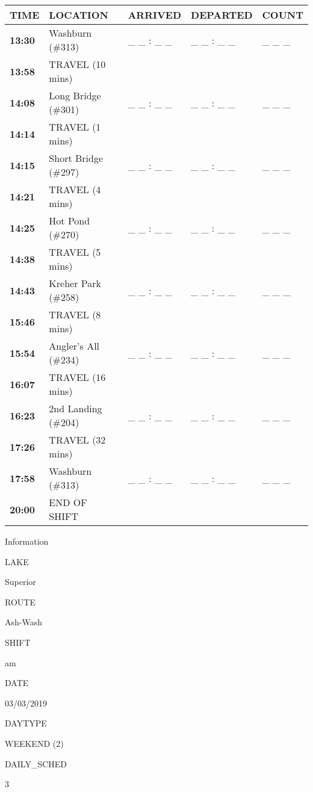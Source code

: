 \documentclass[]{article}
\begin{document}
\begin{tabular}{>{\bfseries}lllll}
\toprule
\textbf{TIME} & \textbf{LOCATION} & \textbf{ARRIVED} & \textbf{DEPARTED} & \textbf{COUNT}\\
\midrule
13:30 & Washburn (\#313) & \_ \_ : \_ \_ & \_ \_ : \_ \_ & \_ \_ \_\\
13:58 & TRAVEL (10 mins) &  &  & \\
14:08 & Long Bridge (\#301) & \_ \_ : \_ \_ & \_ \_ : \_ \_ & \_ \_ \_\\
14:14 & TRAVEL (1 mins) &  &  & \\
14:15 & Short Bridge (\#297) & \_ \_ : \_ \_ & \_ \_ : \_ \_ & \_ \_ \_\\
14:21 & TRAVEL (4 mins) &  &  & \\
14:25 & Hot Pond (\#270) & \_ \_ : \_ \_ & \_ \_ : \_ \_ & \_ \_ \_\\
14:38 & TRAVEL (5 mins) &  &  & \\
14:43 & Kreher Park (\#258) & \_ \_ : \_ \_ & \_ \_ : \_ \_ & \_ \_ \_\\
15:46 & TRAVEL (8 mins) &  &  & \\
15:54 & Angler's All (\#234) & \_ \_ : \_ \_ & \_ \_ : \_ \_ & \_ \_ \_\\
16:07 & TRAVEL (16 mins) &  &  & \\
16:23 & 2nd Landing (\#204) & \_ \_ : \_ \_ & \_ \_ : \_ \_ & \_ \_ \_\\
17:26 & TRAVEL (32 mins) &  &  & \\
17:58 & Washburn (\#313) & \_ \_ : \_ \_ & \_ \_ : \_ \_ & \_ \_ \_\\
20:00 & END OF SHIFT &  &  & \\
\bottomrule
\end{tabular}\newpage

Information

LAKE

Superior

ROUTE

Ash-Wash

SHIFT

am

DATE

03/03/2019

DAYTYPE

WEEKEND (2)

DAILY\_SCHED

3

\vspace{24pt}
\end{document}
